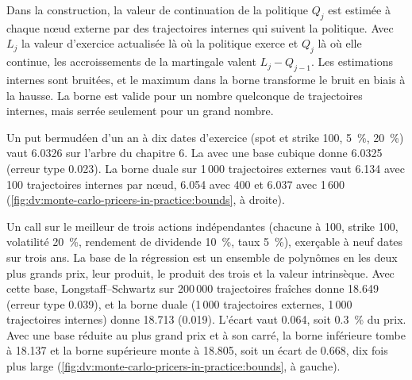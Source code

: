 Dans la construction, la valeur de continuation de la politique $Q_j$ est estimée à chaque nœud externe par des trajectoires internes qui suivent la politique. Avec $L_j$ la
valeur d'exercice actualisée là où la politique exerce et $Q_j$ là où elle continue, les accroissements de la martingale valent $L_j-Q_{j-1}$. Les
estimations internes sont bruitées, et le maximum dans la borne transforme le bruit en biais à la hausse. La borne est valide pour un nombre quelconque de trajectoires internes, mais serrée seulement
pour un grand nombre.

\begin{example}\label{ex:dv:monte-carlo-pricers-in-practice:inner}
Un put bermudéen d'un an à dix dates d'exercice (spot et strike 100, 5~\%, 20~\%) vaut 6.0326 sur l'arbre du chapitre 6. La  avec une
base cubique donne 6.0325 (erreur type 0.023). La borne duale sur 1\,000 trajectoires externes vaut 6.134 avec 100 trajectoires internes par nœud, 6.054 avec 400 et
6.037 avec 1\,600 (\cref{fig:dv:monte-carlo-pricers-in-practice:bounds}, à droite).
\end{example}

\begin{example}\label{ex:dv:monte-carlo-pricers-in-practice:maxcall}
Un call sur le meilleur de trois actions indépendantes (chacune à 100, strike 100, volatilité 20~\%, rendement de dividende 10~\%, taux 5~\%), exerçable à neuf dates
sur trois ans. La base de la régression est un ensemble de polynômes en les deux plus grands prix, leur produit, le produit des trois et la
valeur intrinsèque. Avec cette base, Longstaff--Schwartz sur 200\,000 trajectoires fraîches donne 18.649 (erreur type 0.039), et la borne duale (1\,000 trajectoires externes,
1\,000 trajectoires internes) donne 18.713 (0.019). L'écart vaut 0.064, soit 0.3~\% du prix. Avec une base réduite au plus grand prix et à son carré, la borne inférieure
tombe à 18.137 et la borne supérieure monte à 18.805, soit un écart de 0.668, dix fois plus large
(\cref{fig:dv:monte-carlo-pricers-in-practice:bounds}, à gauche).
\end{example}

